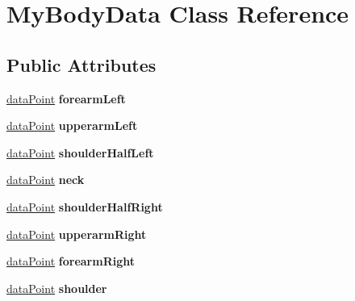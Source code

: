 \hypertarget{classMyBodyData}{}\section{My\+Body\+Data Class Reference}
\label{classMyBodyData}
\subsection*{Public Attributes}
\begin{DoxyCompactItemize}
\item 
\mbox{\label{classMyBodyData_afa97212f34f3e96a5fa7805c11991fcd}} 
\mbox{\hyperlink{structdataPoint}{data\+Point}} {\bfseries forearm\+Left}
\item 
\mbox{\label{classMyBodyData_acd9daef7af42f3de33b2005324ac2792}} 
\mbox{\hyperlink{structdataPoint}{data\+Point}} {\bfseries upperarm\+Left}
\item 
\mbox{\label{classMyBodyData_a206e2aef5c1ff1707b44484cd15f9f94}} 
\mbox{\hyperlink{structdataPoint}{data\+Point}} {\bfseries shoulder\+Half\+Left}
\item 
\mbox{\label{classMyBodyData_ae222e2a791993bb98092b6a40a8487e0}} 
\mbox{\hyperlink{structdataPoint}{data\+Point}} {\bfseries neck}
\item 
\mbox{\label{classMyBodyData_ab288daa77cb18aa6d9313c8797a7b353}} 
\mbox{\hyperlink{structdataPoint}{data\+Point}} {\bfseries shoulder\+Half\+Right}
\item 
\mbox{\label{classMyBodyData_a436c16dfb3dc2e1138867975ff84c981}} 
\mbox{\hyperlink{structdataPoint}{data\+Point}} {\bfseries upperarm\+Right}
\item 
\mbox{\label{classMyBodyData_a2259d7695786678152855f154c1f9e3c}} 
\mbox{\hyperlink{structdataPoint}{data\+Point}} {\bfseries forearm\+Right}
\item 
\mbox{\label{classMyBodyData_aac7520ecca6a3cffb11d9610bd9edb99}} 
\mbox{\hyperlink{structdataPoint}{data\+Point}} {\bfseries shoulder}
\item 

\end{DoxyCompactItemize}
